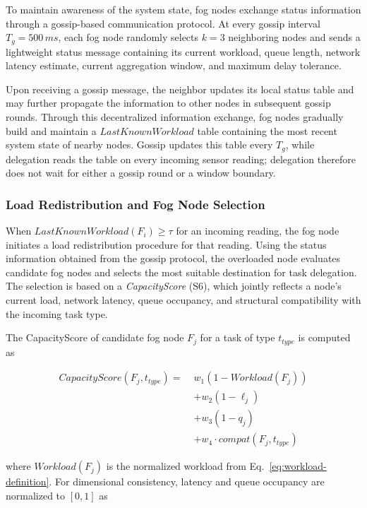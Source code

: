 \documentclass[conference]{IEEEtran}
\begin{document}
    To maintain awareness of the system state, fog nodes exchange status information through a gossip-based communication protocol. At every gossip interval $T_g=500\,ms$, each fog node randomly selects $k=3$ neighboring nodes and sends a lightweight status message containing its current workload, queue length, network latency estimate, current aggregation window, and maximum delay tolerance.

    Upon receiving a gossip message, the neighbor updates its local status table and may further propagate the information to other nodes in subsequent gossip rounds. Through this decentralized information exchange, fog nodes gradually build and maintain a $LastKnownWorkload$ table containing the most recent system state of nearby nodes. Gossip updates this table every $T_g$, while delegation reads the table on every incoming sensor reading; delegation therefore does not wait for either a gossip round or a window boundary.

    \subsubsection{Load Redistribution and Fog Node Selection}

    When $LastKnownWorkload(F_i)\geq\tau$ for an incoming reading, the fog node initiates a load redistribution procedure for that reading. Using the status information obtained from the gossip protocol, the overloaded node evaluates candidate fog nodes and selects the most suitable destination for task delegation. The selection is based on a \textit{CapacityScore} (S6), which jointly reflects a node's current load, network latency, queue occupancy, and structural compatibility with the incoming task type.

    The CapacityScore of candidate fog node $F_j$ for a task of type $t_{type}$ is computed as

    \begin{equation}
    \begin{aligned}
    CapacityScore(F_j,t_{type}) =\;& w_1(1-Workload(F_j)) \\
    &+ w_2(1-\ell_j) \\
    &+ w_3(1-q_j) \\
    &+ w_4\cdot compat(F_j,t_{type})
    \end{aligned}
    \label{eq:capacityscore}
    \end{equation}

    where $Workload(F_j)$ is the normalized workload from Eq.~\eqref{eq:workload-definition}. For dimensional consistency, latency and queue occupancy are normalized to $[0,1]$ as
\end{document}

